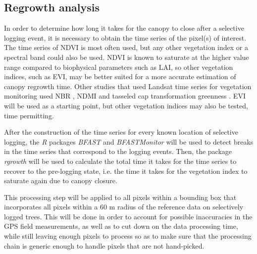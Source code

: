 \documentclass[a4paper,10pt]{article}
\begin{document}
\subsection{Regrowth analysis}

In order to determine how long it takes for the canopy to close after a selective logging event, it is necessary to obtain the time series of the pixel(s) of interest. The time series of \ac{NDVI} is most often used, but any other vegetation index or a spectral band could also be used. \ac{NDVI} is known to saturate at the higher value range compared to biophysical parameters such as \ac{LAI}, so other vegetation indices, such as \ac{EVI}, may be better suited for a more accurate estimation of canopy regrowth time. Other studies that used Landsat time series for vegetation monitoring used \ac{NBR} \citep{schneibel_assessment_2017, shimizu_using_2017}, \ac{NDMI} \citep{dutrieux_reconstructing_2016} and tasseled cap transformation greenness \citep{powell_quantification_2010}. \ac{EVI} will be used as a starting point, but other vegetation indices may also be tested, time permitting.

After the construction of the time series for every known location of selective logging, the \textit{R} packages \textit{BFAST} \citep{verbesselt_detecting_2010} and \textit{BFASTMonitor} \citep{verbesselt_near_2012} will be used to detect breaks in the time series that correspond to the logging events. Then, the package \textit{rgrowth} \citep{devries_tracking_2015} will be used to calculate the total time it takes for the time series to recover to the pre-logging state, i.e. the time it takes for the vegetation index to saturate again due to canopy closure.

This processing step will be applied to all pixels within a bounding box that incorporates all pixels within a 60 m radius of the reference data on selectively logged trees. This will be done in order to account for possible inaccuracies in the GPS field measurements, as well as to cut down on the data processing time, while still leaving enough pixels to process so as to make sure that the processing chain is generic enough to handle pixels that are not hand-picked.
\end{document}
